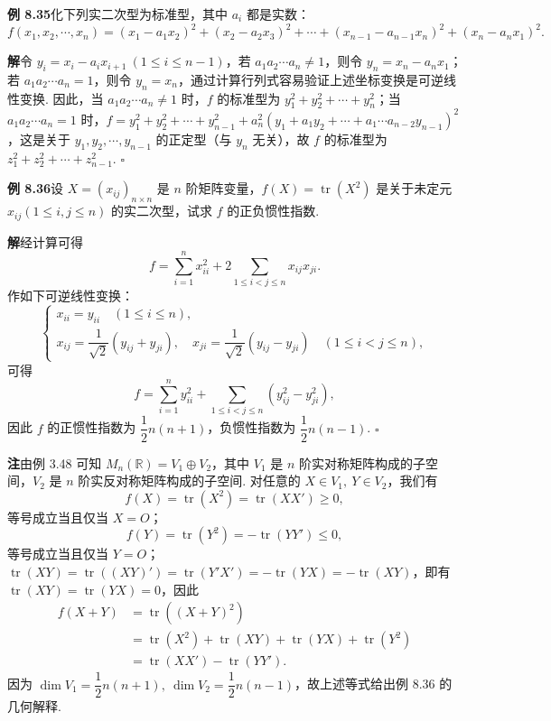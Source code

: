 \documentclass[UTF8, 12pt, fontset=fandol, oneside]{ctexart}
\begin{document}
\noindent\textbf{例 8.35}\quad 化下列实二次型为标准型，其中 $a_i$ 都是实数：
\[
f(x_1,x_2,\cdots,x_n)=(x_1-a_1x_2)^2+(x_2-a_2x_3)^2+\cdots+(x_{n-1}-a_{n-1}x_n)^2+(x_n-a_nx_1)^2.
\]

\noindent\textbf{解}\quad 令 $y_i=x_i-a_ix_{i+1}\ (1\le i\le n-1)$，若 $a_1a_2\cdots a_n\ne 1$，则令 $y_n=x_n-a_nx_1$；若 $a_1a_2\cdots a_n=1$，则令 $y_n=x_n$，通过计算行列式容易验证上述坐标变换是可逆线性变换. 因此，当 $a_1a_2\cdots a_n\ne 1$ 时，$f$ 的标准型为 $y_1^2+y_2^2+\cdots+y_n^2$；当 $a_1a_2\cdots a_n=1$ 时，$f=y_1^2+y_2^2+\cdots+y_{n-1}^2+a_n^2(y_1+a_1y_2+\cdots+a_1\cdots a_{n-2}y_{n-1})^2$，这是关于 $y_1,y_2,\cdots,y_{n-1}$ 的正定型（与 $y_n$ 无关），故 $f$ 的标准型为 $z_1^2+z_2^2+\cdots+z_{n-1}^2$. $\ensuremath{\square}$

\noindent\textbf{例 8.36}\quad 设 $X=(x_{ij})_{n\times n}$ 是 $n$ 阶矩阵变量，$f(X)=\operatorname{tr}(X^2)$ 是关于未定元 $x_{ij}(1\le i,j\le n)$ 的实二次型，试求 $f$ 的正负惯性指数.

\noindent\textbf{解}\quad 经计算可得
\[
f=\sum_{i=1}^n x_{ii}^2+2\sum_{1\le i<j\le n}x_{ij}x_{ji}.
\]
作如下可逆线性变换：
\[
\left\{\begin{array}{l}
x_{ii}=y_{ii}\quad (1\le i\le n),\\
x_{ij}=\dfrac1{\sqrt2}(y_{ij}+y_{ji}),\quad
x_{ji}=\dfrac1{\sqrt2}(y_{ij}-y_{ji})\quad (1\le i<j\le n),
\end{array}\right.
\]
可得
\[
f=\sum_{i=1}^n y_{ii}^2+\sum_{1\le i<j\le n}(y_{ij}^2-y_{ji}^2),
\]
因此 $f$ 的正惯性指数为 $\dfrac12n(n+1)$，负惯性指数为 $\dfrac12n(n-1)$. $\ensuremath{\square}$

\noindent\textbf{注}\quad 由例 3.48 可知 $M_n(\mathbb{R})=V_1\oplus V_2$，其中 $V_1$ 是 $n$ 阶实对称矩阵构成的子空间，$V_2$ 是 $n$ 阶实反对称矩阵构成的子空间. 对任意的 $X\in V_1,\ Y\in V_2$，我们有
\[
f(X)=\operatorname{tr}(X^2)=\operatorname{tr}(XX')\ge 0,
\]
等号成立当且仅当 $X=O$；
\[
f(Y)=\operatorname{tr}(Y^2)=-\operatorname{tr}(YY')\le 0,
\]
等号成立当且仅当 $Y=O$；$\operatorname{tr}(XY)=\operatorname{tr}((XY)')=\operatorname{tr}(Y'X')=-\operatorname{tr}(YX)=-\operatorname{tr}(XY)$，即有 $\operatorname{tr}(XY)=\operatorname{tr}(YX)=0$，因此
\[
\begin{aligned}
f(X+Y)&=\operatorname{tr}((X+Y)^2)\\
&=\operatorname{tr}(X^2)+\operatorname{tr}(XY)+\operatorname{tr}(YX)+\operatorname{tr}(Y^2)\\
&=\operatorname{tr}(XX')-\operatorname{tr}(YY').
\end{aligned}
\]
因为 $\dim V_1=\dfrac12n(n+1),\ \dim V_2=\dfrac12n(n-1)$，故上述等式给出例 8.36 的几何解释.
\end{document}
